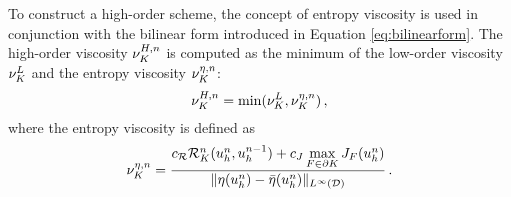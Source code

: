To construct a high-order scheme, the concept of entropy viscosity is used in
conjunction with the bilinear form introduced in Equation
\eqref{eq:bilinearform}.  The high-order viscosity
$\highordercellviscosity[\timeindex]$ is computed as the minimum of the
low-order viscosity $\lowordercellviscosity$ and the entropy viscosity
$\entropycellviscosity[\timeindex]$:
\begin{equation}
   \highordercellviscosity[\timeindex] = \min(\lowordercellviscosity,
   \entropycellviscosity[\timeindex]) \eqc
\end{equation}
where the entropy viscosity is defined as
\begin{equation}
   \entropycellviscosity[n] = \frac{\entropyresidualcoef
   \entropyresidual_\cellindex^\timeindex(\approximatescalarsolution^\timeindex,
   \approximatescalarsolution^{\timeindex-1})
   + \entropyjumpcoef\max\limits_{F\in\partial \cellindex}\entropyjump_F(
   \approximatescalarsolution^\timeindex)}
   {\|\entropy(\approximatescalarsolution^\timeindex)
   -\bar{\entropy}(\approximatescalarsolution^\timeindex)\|_{L^\infty(\domain)}}
   \eqp
\end{equation}
